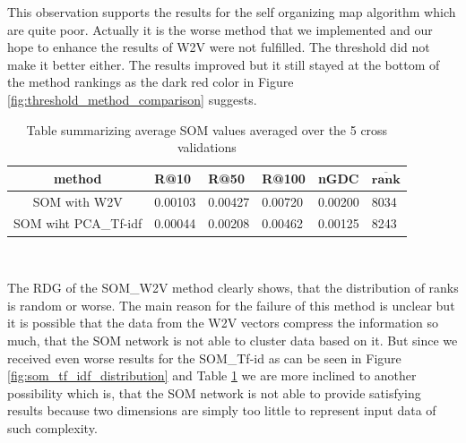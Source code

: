 This observation supports the results for the self organizing map algorithm which are quite poor. Actually it is the worse method that we implemented and our hope to enhance the results of W2V were not fulfilled. The threshold did not make it better either. The results improved but it still stayed at the bottom of the method rankings as the dark red color in Figure \ref{fig:threshold_method_comparison} suggests.

\begin{table}[h]
\centering
\renewcommand{\arraystretch}{1.5}
\begin{tabu} to 1\textwidth { | c || X[c] | X[c] | X[c] | X[c] | X[c] |}
 \hline
 \textbf{method} & \textbf{R@10} & \textbf{R@50} & \textbf{R@100} & \textbf{nGDC} & $ \boldsymbol{\overline{rank}} $ \\
 \hline
 \hline
 SOM with W2V & 0.00103 & 0.00427 & 0.00720 & 0.00200 & 8034 \\
 \hline
 SOM wiht PCA\_Tf-idf & 0.00044 & 0.00208 & 0.00462 & 0.00125 & 8243 \\
 \hline
\end{tabu} \\
\caption{Table summarizing average SOM values averaged over the 5 cross validations}
\label{table:som}
\end{table}

The RDG of the SOM\_W2V method clearly shows, that the distribution of ranks is random or worse. The main reason for the failure of this method is unclear but it is possible that the data from the W2V vectors compress the information so much, that the SOM network is not able to cluster data based on it. But since we received even worse results for the SOM\_Tf-id as can be seen in Figure \ref{fig:som_tf_idf_distribution} and Table \ref{table:som} we are more inclined to another possibility which is, that the SOM network is not able to provide satisfying results because two dimensions are simply too little to represent input data of such complexity.

